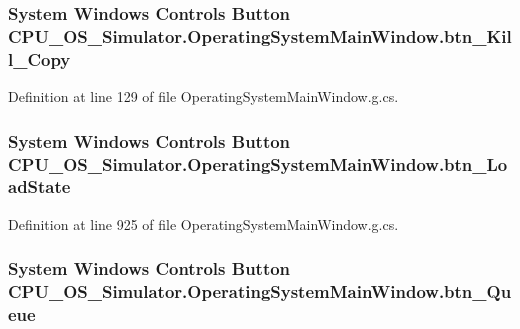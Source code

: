 \subsubsection[{btn\+\_\+\+Kill\+\_\+\+Copy}]{\setlength{\rightskip}{0pt plus 5cm}System Windows Controls Button C\+P\+U\+\_\+\+O\+S\+\_\+\+Simulator.\+Operating\+System\+Main\+Window.\+btn\+\_\+\+Kill\+\_\+\+Copy\hspace{0.3cm}{\ttfamily [package]}}\label{class_c_p_u___o_s___simulator_1_1_operating_system_main_window_a408a9f81462c276937e813344d29fc3c}


Definition at line 129 of file Operating\+System\+Main\+Window.\+g.\+cs.

\hypertarget{class_c_p_u___o_s___simulator_1_1_operating_system_main_window_ada2a0a3adb1f88558207fdd5b5dbea30}{}
\subsubsection[{btn\+\_\+\+Load\+State}]{\setlength{\rightskip}{0pt plus 5cm}System Windows Controls Button C\+P\+U\+\_\+\+O\+S\+\_\+\+Simulator.\+Operating\+System\+Main\+Window.\+btn\+\_\+\+Load\+State\hspace{0.3cm}{\ttfamily [package]}}\label{class_c_p_u___o_s___simulator_1_1_operating_system_main_window_ada2a0a3adb1f88558207fdd5b5dbea30}


Definition at line 925 of file Operating\+System\+Main\+Window.\+g.\+cs.

\hypertarget{class_c_p_u___o_s___simulator_1_1_operating_system_main_window_a241f1be0b04ce501c83e182629a6c694}{}
\subsubsection[{btn\+\_\+\+Queue}]{\setlength{\rightskip}{0pt plus 5cm}System Windows Controls Button C\+P\+U\+\_\+\+O\+S\+\_\+\+Simulator.\+Operating\+System\+Main\+Window.\+btn\+\_\+\+Queue\hspace{0.3cm}{\ttfamily [package]}}\label{class_c_p_u___o_s___simulator_1_1_operating_system_main_window_a241f1be0b04ce501c83e182629a6c694}


